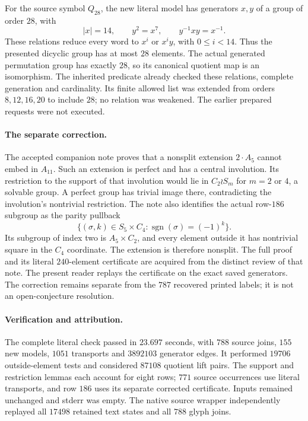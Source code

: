 \documentclass[11pt]{article}
\begin{document}
For the source symbol $Q_{28}$, the new literal model has generators
$x,y$ of a group of order $28$, with
\[
 |x|=14,\qquad y^2=x^7,\qquad y^{-1}xy=x^{-1}.
\]
These relations reduce every word to $x^i$ or $x^iy$, with $0\leq i<14$.
Thus the presented dicyclic group has at most $28$ elements. The actual
generated permutation group has exactly $28$, so its canonical quotient
map is an isomorphism. The inherited predicate already checked these
relations, complete generation and cardinality. Its finite allowed list
was extended from orders $8,12,16,20$ to include $28$; no relation was
weakened. The earlier prepared requests were not executed.

\paragraph{The separate correction.}
The accepted companion note \cite{correction} proves that a nonsplit
extension $2\cdot A_5$ cannot embed in $A_{11}$. Such an extension is
perfect and has a central involution. Its restriction to the support of
that involution would lie in $C_2\wr S_m$ for $m=2$ or $4$, a solvable
group. A perfect group has trivial image there, contradicting the
involution's nontrivial restriction. The note also identifies the actual
row-$186$ subgroup as the parity pullback
\[
 \{(\sigma,k)\in S_5\times C_4:
                  \operatorname{sgn}(\sigma)=(-1)^k\}.
\]
Its subgroup of index two is $A_5\times C_2$, and every element outside
it has nontrivial square in the $C_4$ coordinate. The extension is
therefore nonsplit. The full proof and its literal $240$-element
certificate are acquired from the distinct review of that note. The
present reader replays the certificate on the exact saved generators.
The correction remains separate from the $787$ recovered printed labels;
it is not an open-conjecture resolution.

\paragraph{Verification and attribution.}
The complete literal check passed in $23.697$ seconds, with $788$ source
joins, $155$ new models, $1051$ transports and $3892103$ generator edges.
It performed $19706$ outside-element tests and considered $87108$ quotient
lift pairs. The support and restriction lemmas each account for eight
rows; $771$ source occurrences use literal transports, and row $186$
uses its separate corrected certificate. Inputs remained unchanged and
stderr was empty. The native source wrapper independently replayed all
$17498$ retained text states and all $788$ glyph joins.
\end{document}
